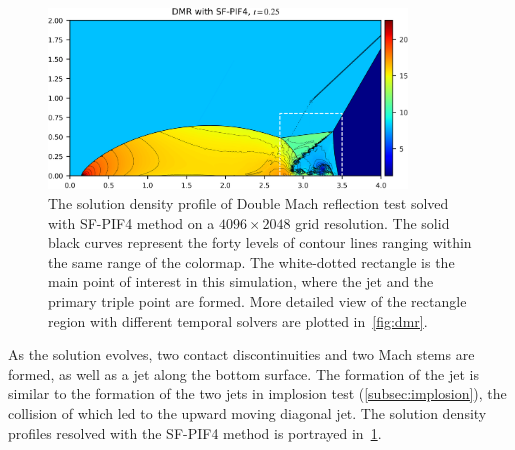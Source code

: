 \begin{figure}
    \centering
    \includegraphics[width=0.85\textwidth]{fig/dmr_overview_sf4.png}
    \caption{The solution density profile of Double Mach reflection test
        solved with SF-PIF4 method on a \( 4096 \times 2048 \) grid resolution.
        The solid black curves represent the forty levels of contour lines
        ranging within the same range of the colormap.
        The white-dotted rectangle is the
        main point of interest in this simulation,
        where the jet and the primary triple point are formed.
        More detailed view of the rectangle region
        with different temporal solvers are plotted in~\cref{fig:dmr}.
    }\label{fig:dmr_overview}
\end{figure}

As the solution evolves, two contact discontinuities and two Mach stems are formed,
as well as a jet along the bottom surface. The formation of the jet is similar
to the formation of the two jets in implosion test (\cref{subsec:implosion}),
the collision of which led to the upward moving diagonal jet.
The solution density profiles resolved with the SF-PIF4 method
is portrayed in~\cref{fig:dmr_overview}.

